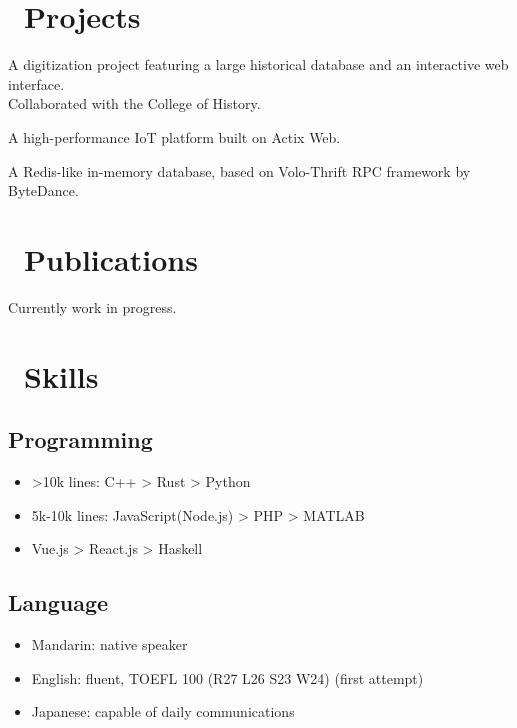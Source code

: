 \documentclass{resume}
\begin{document}
\section{\faCode\ Projects}
A digitization project featuring a large historical database and an interactive web interface.\\
Collaborated with the College of History.

A high-performance IoT platform built on Actix Web.

A Redis-like in-memory database, based on Volo-Thrift RPC framework by ByteDance.

\section{\faBookmarkO\ Publications}
Currently work in progress.

\section{\faCogs\ Skills}
\subsection{\textbf{Programming}}
\begin{itemize}[parsep=0.5ex]
  \item >10k lines: C++ > Rust > Python
  \item 5k-10k lines: JavaScript(Node.js) > PHP > MATLAB
  \item <5k lines: Java > Vue.js > React.js > Haskell
\end{itemize}
\subsection{\textbf{Language}}
\begin{itemize}[parsep=0.5ex]
  \item Mandarin: native speaker
  \item English: fluent, TOEFL 100 (R27 L26 S23 W24) (first attempt)
  \item Japanese: capable of daily communications
\end{itemize}
\end{document}
